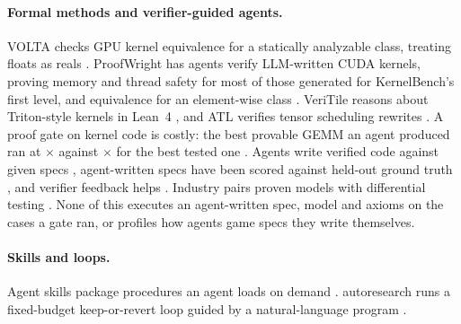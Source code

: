 \paragraph{Formal methods and verifier-guided agents.}
VOLTA checks GPU kernel equivalence for a statically analyzable class, treating floats
as reals \citep{driscoll2025volta}. ProofWright has agents verify LLM-written CUDA kernels,
proving memory and thread safety for most of those generated for KernelBench's first
level, and equivalence for an element-wise class \citep{chatterjee2025proofwright}.
VeriTile reasons about Triton-style kernels in Lean~4
\citep{veritile2026,demoura2021lean4}, and ATL verifies tensor scheduling rewrites
\citep{liu2022atl}. A proof gate on kernel code is costly: the best provable GEMM an agent
produced ran at \provableGemm$\times$ against \testedGemm$\times$ for the best tested one
\citep{costa2026aicompiler}. Agents write verified code against given specs
\citep{loughridge2024dafnybench,bursuc2025vericoding}, agent-written specs have been scored
against held-out ground truth \citep{ye2025verina,thakur2025clever}, and verifier feedback
helps \citep{aggarwal2025alphaverus}. Industry pairs proven models with differential
testing \citep{disselkoen2024cedar}. None of this executes an agent-written spec, model and
axioms on the cases a gate ran, or profiles how agents game specs they write themselves.

\paragraph{Skills and loops.}
Agent skills package procedures an agent loads on demand \citep{anthropic2025skills}.
autoresearch runs a fixed-budget keep-or-revert loop guided by a natural-language
program \citep{karpathy2026autoresearch}.
